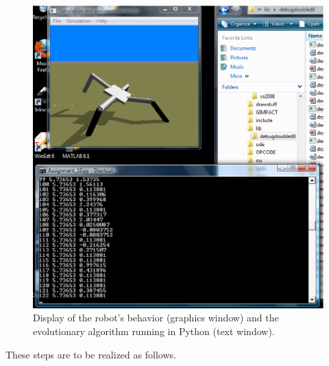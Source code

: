 \documentclass[12pt]{article}
\begin{document}
\begin{figure}
\centerline{
\includegraphics[width=1.0\textwidth]{Fig1.eps}}
\caption{Display of the robot's behavior (graphics window) and the evolutionary algorithm running in Python (text window).}
\label{Fig1}
\end{figure}

These steps are to be realized as follows.
\end{document}
